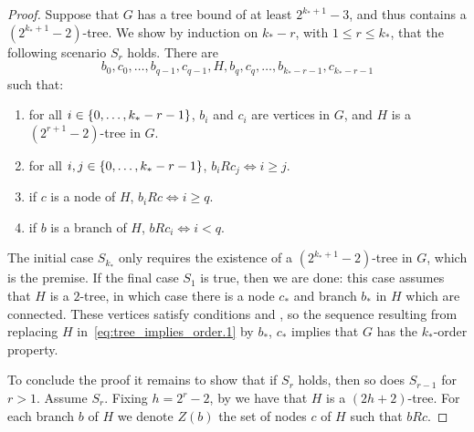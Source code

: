 \begin{theorem}
\begin{proof}
            Suppose that $G$ has a tree bound of at least $2^{k_*+1}-3$, and thus contains a $(2^{k_*+1}-2)$-tree.
            We show by induction on $k_*-r$, with $1 \leq r \leq k_*$, that the following scenario $S_r$ holds.
            There are
            \begin{equation}\label{eq:tree_implies_order.1}
                b_0, c_0, \dots, b_{q-1}, c_{q-1}, H, b_q, c_q, \dots, b_{k_*-r-1}, c_{k_*-r-1}
            \end{equation}
            such that:
            \begin{enumerate}
                \item\label{itm:tree_implies_order.1} for all $i \in \{ 0, \dots, k_*-r-1 \}$, $b_i$ and $c_i$ are vertices in $G$,
                    and $H$ is a $(2^{r+1}-2)$-tree in $G$.
                \item\label{itm:tree_implies_order.2} for all $i,j \in \{ 0, \dots, k_*-r-1 \}$, $b_i R c_j \Leftrightarrow i \geq j$.
                \item\label{itm:tree_implies_order.3} if $c$ is a node of $H$, $b_i R c \Leftrightarrow i \geq q$.
                \item\label{itm:tree_implies_order.4} if $b$ is a branch of $H$, $b R c_i \Leftrightarrow i < q$.
            \end{enumerate}

            The initial case $S_{k_*}$ only requires the existence of a $(2^{k_*+1}-2)$-tree in $G$, which is the premise.
            If the final case $S_1$ is true, then we are done:
            this case assumes that $H$ is a $2$-tree, in which case there is a node $c_*$ and branch $b_*$ in $H$ which
            are connected.
            These vertices satisfy conditions  and , so
            the sequence resulting from replacing $H$ in~\eqref{eq:tree_implies_order.1} by $b_*$, $c_*$ implies that $G$
            has the $k_*$-order property. 

            To conclude the proof it remains to show that if $S_r$ holds, then so does $S_{r-1}$ for $r>1$.
            Assume $S_r$.
            Fixing $h = 2^r - 2$, by  we have that $H$ is a $(2h +2)$-tree.
            For each branch $b$ of $H$ we denote $Z(b)$ the set of nodes $c$ of $H$ such that $b R c$.


\end{proof}
\end{theorem}
